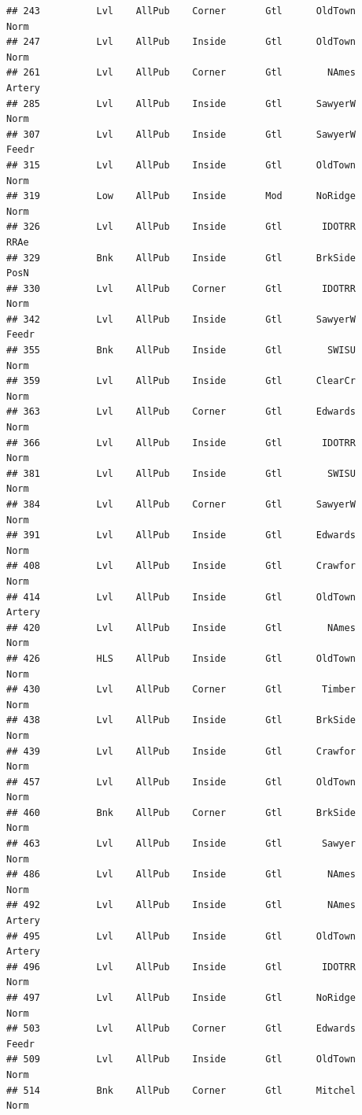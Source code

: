 \documentclass[]{article}
\begin{document}
\begin{verbatim}
## 243          Lvl    AllPub    Corner       Gtl      OldTown       Norm
## 247          Lvl    AllPub    Inside       Gtl      OldTown       Norm
## 261          Lvl    AllPub    Corner       Gtl        NAmes     Artery
## 285          Lvl    AllPub    Inside       Gtl      SawyerW       Norm
## 307          Lvl    AllPub    Inside       Gtl      SawyerW      Feedr
## 315          Lvl    AllPub    Inside       Gtl      OldTown       Norm
## 319          Low    AllPub    Inside       Mod      NoRidge       Norm
## 326          Lvl    AllPub    Inside       Gtl       IDOTRR       RRAe
## 329          Bnk    AllPub    Inside       Gtl      BrkSide       PosN
## 330          Lvl    AllPub    Corner       Gtl       IDOTRR       Norm
## 342          Lvl    AllPub    Inside       Gtl      SawyerW      Feedr
## 355          Bnk    AllPub    Inside       Gtl        SWISU       Norm
## 359          Lvl    AllPub    Inside       Gtl      ClearCr       Norm
## 363          Lvl    AllPub    Corner       Gtl      Edwards       Norm
## 366          Lvl    AllPub    Inside       Gtl       IDOTRR       Norm
## 381          Lvl    AllPub    Inside       Gtl        SWISU       Norm
## 384          Lvl    AllPub    Corner       Gtl      SawyerW       Norm
## 391          Lvl    AllPub    Inside       Gtl      Edwards       Norm
## 408          Lvl    AllPub    Inside       Gtl      Crawfor       Norm
## 414          Lvl    AllPub    Inside       Gtl      OldTown     Artery
## 420          Lvl    AllPub    Inside       Gtl        NAmes       Norm
## 426          HLS    AllPub    Inside       Gtl      OldTown       Norm
## 430          Lvl    AllPub    Corner       Gtl       Timber       Norm
## 438          Lvl    AllPub    Inside       Gtl      BrkSide       Norm
## 439          Lvl    AllPub    Inside       Gtl      Crawfor       Norm
## 457          Lvl    AllPub    Inside       Gtl      OldTown       Norm
## 460          Bnk    AllPub    Corner       Gtl      BrkSide       Norm
## 463          Lvl    AllPub    Inside       Gtl       Sawyer       Norm
## 486          Lvl    AllPub    Inside       Gtl        NAmes       Norm
## 492          Lvl    AllPub    Inside       Gtl        NAmes     Artery
## 495          Lvl    AllPub    Inside       Gtl      OldTown     Artery
## 496          Lvl    AllPub    Inside       Gtl       IDOTRR       Norm
## 497          Lvl    AllPub    Inside       Gtl      NoRidge       Norm
## 503          Lvl    AllPub    Corner       Gtl      Edwards      Feedr
## 509          Lvl    AllPub    Inside       Gtl      OldTown       Norm
## 514          Bnk    AllPub    Corner       Gtl      Mitchel       Norm

\end{verbatim}
\end{document}
